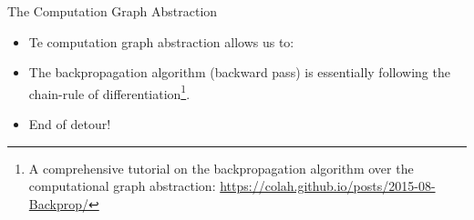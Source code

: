 \begin{frame}{The Computation Graph Abstraction}
\begin{scriptsize}
\begin{itemize}

\item  Te computation graph abstraction allows us to:


\begin{enumerate}
 \end{enumerate}
  
  
  
  
 \item The backpropagation algorithm (backward pass) is essentially following the chain-rule of differentiation\footnote{A comprehensive tutorial on the backpropagation algorithm over the computational graph abstraction: \url{https://colah.github.io/posts/2015-08-Backprop/}}.
 
 
 \item End of detour!
 
\end{itemize}
\end{scriptsize}
\end{frame}




